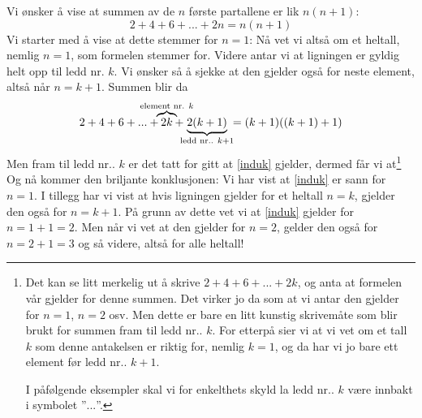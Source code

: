 Vi ønsker å vise at summen av de $ n $ første partallene er lik $ n(n+1) $:
\begin{equation}
2+4+6+...+2n=n(n+1) \label{induk}
\end{equation}
Vi starter med å vise at dette stemmer for $ {n=1} $:
Nå vet vi altså om et heltall, nemlig $ {n=1} $, som formelen stemmer for. Videre antar vi at ligningen er gyldig helt opp til ledd nr. $ k $. Vi ønsker så å sjekke at den gjelder også for neste element, altså  når $ n=k+1 $. Summen blir da
\[ 2+4+6+...+\quad\mathclap{\overbrace{2k}^{\text{element nr. }k} \;\;\;\,}+\quad\;\;\;\mathclap{\underbrace{2(k+1)}_{\text{ledd nr.. }k+1}}\qquad=(k+1)((k+1)+1) \]
Men fram til ledd nr.. $ k $ er det tatt for gitt at \eqref{induk} gjelder, dermed får vi at\footnote{Det kan se litt merkelig ut å skrive $ {2+4+6+...+2k }$, og anta at formelen vår gjelder for denne summen. Det virker jo da som at vi antar den gjelder for $ {n=1 }$, $ {n=2 }$ osv. Men dette er bare en litt kunstig skrivemåte som blir brukt for summen fram til ledd nr.. $ k $. For etterpå sier vi at vi vet om et tall $ k $ som denne antakelsen er riktig for, nemlig $ {k=1} $, og da har vi jo bare ett element før ledd nr.. $ {k+1} $. 
	
I påfølgende eksempler skal vi for enkelthets skyld la ledd nr.. $ k $ være innbakt i symbolet ''$ ... $''. }
Og nå kommer den briljante konklusjonen: Vi har vist at \eqref{induk} er sann for ${ n=1 }$. I tillegg har vi vist at hvis ligningen gjelder for et heltall ${n= k} $, gjelder den også for $ {n=k+1} $. På grunn av dette vet vi at \eqref{induk} gjelder for ${n= 1+1=2} $. Men når vi vet at den gjelder for $ {n=2} $, gelder den også for $ {n=2+1=3} $ og så videre, altså for alle heltall!\regv
{}
